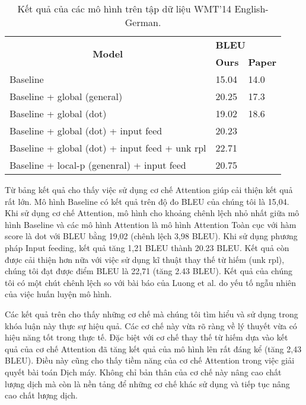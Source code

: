 \begin{table}[]
	\centering
	\begin{tabular}{|l|l|l|}
		\hline
		\multicolumn{1}{|c|}{\multirow{2}{*}{\textbf{Model}}} & \multicolumn{2}{l|}{\textbf{BLEU}} \\ \cline{2-3} 
		\multicolumn{1}{|c|}{}                                & \textbf{Ours}   & \textbf{Paper}   \\ \hline
		Baseline                                              & 15.04           & 14.0             \\ \hline
		Baseline + global (general)                           & 20.25           & 17.3             \\ \hline
		Baseline + global (dot)                               & 19.02           & 18.6             \\ \hline
		Baseline + global (dot) + input feed                  & 20.23           &                  \\ \hline
		Baseline + global (dot) + input feed + unk rpl        & 22.71           &                  \\ \hline
		Baseline + local-p (genenral) + input feed            & 20.75           &                  \\ \hline
	\end{tabular}
	\caption{Kết quả của các mô hình trên tập dữ liệu WMT'14 English-German.}
	\label{wmt14-results}
\end{table}
Từ bảng kết quả cho thấy việc sử dụng cơ chế Attention giúp cải thiện kết quả rất lớn. Mô hình Baseline có kết quả trên độ đo BLEU của chúng tôi là 15,04. Khi sử dụng cơ chế Attention, mô hình cho khoảng chênh lệch nhỏ nhất giữa mô hình Baseline và các mô hình Attention là mô hình Attention Toàn cục với hàm score là dot với BLEU bằng 19,02 (chênh lệch 3,98 BLEU). Khi sử dụng phương pháp Input feeding, kết quả tăng 1,21 BLEU thành 20.23 BLEU. Kết quả còn được cải thiện hơn nữa với việc sử dụng kĩ thuật thay thế từ hiếm (unk rpl), chúng tôi đạt được điểm BLEU là 22,71 (tăng 2.43 BLEU). Kết quả của chúng tôi có một chút chênh lệch so với bài báo của Luong et al. \cite{attentionThangLuong2015} do yếu tố ngẫu nhiên của việc huấn luyện mô hình.

Các kết quả trên cho thấy những cơ chế mà chúng tôi tìm hiểu và sử dụng trong khóa luận này thực sự hiệu quả. Các cơ chế này vừa rõ ràng về lý thuyết vừa có hiệu năng tốt trong thực tế. Đặc biệt với cơ chế thay thế từ hiếm dựa vào kết quả của cơ chế Attention đã tăng kết quả của mô hình lên rất đáng kể (tăng 2,43 BLEU). Điều này cũng cho thấy tiềm năng của cơ chế Attention trong việc giải quyết bài toán Dịch máy. Không chỉ bản thân của cơ chế này nâng cao chất lượng dịch mà còn là nền tảng để những cơ chế khác sử dụng và tiếp tục nâng cao chất lượng dịch.
